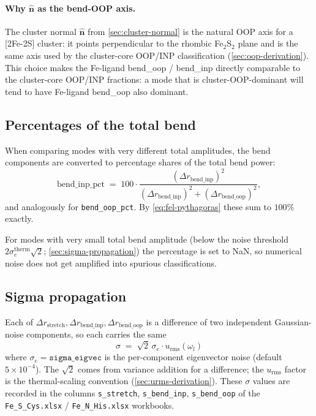 \documentclass[10pt,a4paper,twoside]{article}
\newcommand{\nhat}{\hat{\mathbf{n}}}
\newcommand{\urms}{u_{\mathrm{rms}}}
\newcommand{\codref}[1]{%
  \quad\text{\textcolor{gray!70!black}{\footnotesize $\rightsquigarrow$~\texttt{#1}}}}
\newcommand{\file}[1]{\texttt{#1}}
\newcommand{\cfgkey}[1]{\texttt{#1}}
\begin{document}
\paragraph{Why $\nhat$ as the bend-OOP axis.}
The cluster normal $\nhat$ from \cref{sec:cluster-normal} is the
natural OOP axis for a [2Fe-2S] cluster: it points perpendicular to
the rhombic Fe$_2$S$_2$ plane and is the same axis used by the
cluster-core OOP/INP classification (\cref{sec:oop-derivation}).
This choice makes the Fe-ligand bend\_oop / bend\_inp directly
comparable to the cluster-core OOP/INP fractions: a mode that is
cluster-OOP-dominant will tend to have Fe-ligand bend\_oop also
dominant.

\codref{core.analyze\_fe\_ligand}

\subsection{Percentages of the total bend}

When comparing modes with very different total amplitudes, the bend
components are converted to percentage shares of the total bend
power:
\begin{equation}
  \text{bend\_inp\_pct}
    \;=\;
  100 \cdot \frac{(\Delta r_\text{bend\_inp})^2}{
                (\Delta r_\text{bend\_inp})^2 + (\Delta r_\text{bend\_oop})^2},
\end{equation}
and analogously for \texttt{bend\_oop\_pct}. By
\cref{eq:fel-pythagoras} these sum to $100\%$ exactly.

For modes with very small total bend amplitude (below the
noise threshold $2\sigma_e^\text{therm}\sqrt{2}$;
\cref{sec:sigma-propagation}) the percentage is set to NaN, so
numerical noise does not get amplified into spurious
classifications.

\subsection{Sigma propagation}

Each of $\Delta r_\text{stretch}, \Delta r_\text{bend\_inp},
\Delta r_\text{bend\_oop}$ is a difference of two independent
Gaussian-noise components, so each carries the same
\begin{equation}
  \sigma \;=\; \sqrt{2}\,\sigma_e \cdot \urms(\omega_l)
  \label{eq:fel-sigma}
\end{equation}
where $\sigma_e = \cfgkey{sigma\_eigvec}$ is the per-component
eigenvector noise (default $5 \times 10^{-4}$). The $\sqrt{2}$
comes from variance addition for a difference; the $\urms$ factor
is the thermal-scaling convention (\cref{sec:urms-derivation}). These
$\sigma$ values are recorded in the columns \texttt{s\_stretch},
\texttt{s\_bend\_inp}, \texttt{s\_bend\_oop} of the
\file{Fe\_S\_Cys.xlsx} / \file{Fe\_N\_His.xlsx} workbooks.
\end{document}
